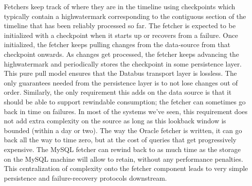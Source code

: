 Fetchers keep track of where they are in the timeline using checkpoints which typically contain a highwatermark corresponding to the contiguous section of the timeline that has been reliably processed so far. The fetcher is expected to be initialized with a checkpoint when it starts up or recovers from a failure. Once initialized, the fetcher keeps pulling changes from the data-source from that checkpoint onwards. As changes get processed, the fetcher keeps advancing the highwatermark and periodically stores the checkpoint in some persistence layer. This pure pull model ensures that the Databus transport layer is lossless. The only guarantees needed from the persistence layer is to not lose changes out of order. Similarly, the only requirement this adds on the data source is that it should be able to support rewindable consumption; the fetcher can sometimes go back in time on failures. In most of the systems we've seen, this requirement does not add extra complexity on the source as long as this lookback window is bounded (within a day or two). The way the Oracle fetcher is written, it can go back all the way to time zero, but at the cost of queries that get progressively expensive. The MySQL fetcher can rewind back to as much time as the storage on the MySQL machine will allow to retain, without any performance penalties. This centralization of complexity onto the fetcher component leads to very simple persistence and failure-recovery protocols downstream.
